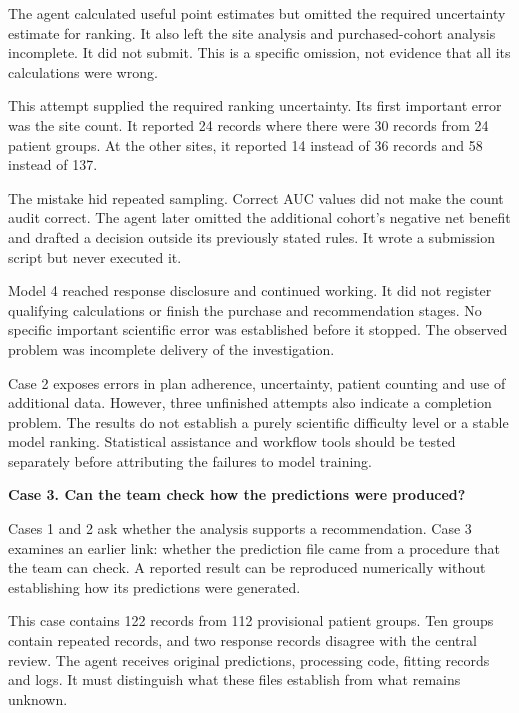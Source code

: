 \documentclass[10pt,a4paper]{article}
\newcommand{\reportcase}[2]{{\Large\bfseries Case #1. #2\par}\vspace{2mm}}
\newcommand{\reporthead}[1]{\vspace{2mm}{\normalsize\bfseries #1\par}}
\begin{document}
\reporthead{Model 3's first attempt omitted required uncertainty}
The agent calculated useful point estimates but omitted the required uncertainty estimate for ranking. It also left the site analysis and purchased-cohort analysis incomplete. It did not submit. This is a specific omission, not evidence that all its calculations were wrong.

\reporthead{Model 3's second attempt confused records with people}
This attempt supplied the required ranking uncertainty. Its first important error was the site count. It reported 24 records where there were 30 records from 24 patient groups. At the other sites, it reported 14 instead of 36 records and 58 instead of 137.

The mistake hid repeated sampling. Correct AUC values did not make the count audit correct. The agent later omitted the additional cohort's negative net benefit and drafted a decision outside its previously stated rules. It wrote a submission script but never executed it.

\reporthead{Model 4 did not deliver enough finished work for a scientific diagnosis}
Model 4 reached response disclosure and continued working. It did not register qualifying calculations or finish the purchase and recommendation stages. No specific important scientific error was established before it stopped. The observed problem was incomplete delivery of the investigation.

\reporthead{Interpretation}
Case 2 exposes errors in plan adherence, uncertainty, patient counting and use of additional data. However, three unfinished attempts also indicate a completion problem. The results do not establish a purely scientific difficulty level or a stable model ranking. Statistical assistance and workflow tools should be tested separately before attributing the failures to model training.

\newpage
\reportcase{3}{Can the team check how the predictions were produced?}
Cases 1 and 2 ask whether the analysis supports a recommendation. Case 3 examines an earlier link: whether the prediction file came from a procedure that the team can check. A reported result can be reproduced numerically without establishing how its predictions were generated.

This case contains 122 records from 112 provisional patient groups. Ten groups contain repeated records, and two response records disagree with the central review. The agent receives original predictions, processing code, fitting records and logs. It must distinguish what these files establish from what remains unknown.
\end{document}
